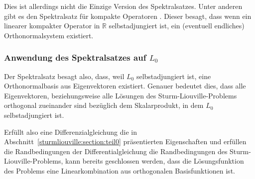 Dies ist allerdings nicht die Einzige Version des Spektralsatzes.
Unter anderen gibt es den Spektralsatz für kompakte Operatoren 
\cite{sturmliouville:spektralsatz-wiki}.
Dieser besagt, dass wenn ein linearer kompakter Operator in
$\mathbb{R}$ selbstadjungiert ist, ein (eventuell endliches)
Orthonormalsystem existiert.

\subsubsection{Anwendung des Spektralsatzes auf $L_0$}

Der Spektralsatz besagt also, dass, weil $L_0$ selbstadjungiert ist, eine
Orthonormalbasis aus Eigenvektoren existiert.
Genauer bedeutet dies, dass alle Eigenvektoren, beziehungsweise alle Lösungen
des Sturm-Liouville-Problems orthogonal zueinander sind bezüglich dem
Skalarprodukt, in dem $L_0$ selbstadjungiert ist.

Erfüllt also eine Differenzialgleichung die in
Abschnitt~\ref{sturmliouville:section:teil0} präsentierten Eigenschaften und 
erfüllen die Randbedingungen der Differentialgleichung die Randbedingungen
des Sturm-Liouville-Problems, kann bereits geschlossen werden, dass die
Lösungsfunktion des Problems eine Linearkombination aus orthogonalen
Basisfunktionen ist.